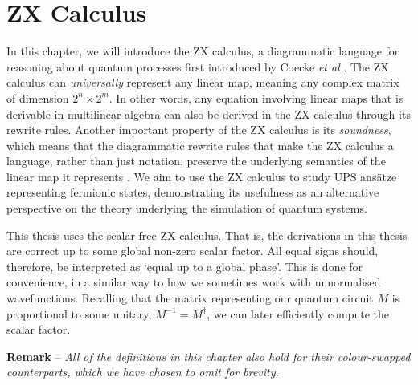 \chapter{ZX Calculus}%
\label{zx-calculus}

In this chapter, we will introduce the ZX calculus, a diagrammatic language for reasoning about quantum processes first introduced by Coecke \textit{et al} \cite{Coecke2011}. The ZX calculus can \textit{universally} represent any linear map, meaning any complex matrix of dimension $2^n \times 2^m$. In other words, any equation involving linear maps that is derivable in multilinear algebra can also be derived in the ZX calculus through its rewrite rules. Another important property of the ZX calculus is its \textit{soundness}, which means that the diagrammatic rewrite rules that make the ZX calculus a language, rather than just notation, preserve the underlying semantics of the linear map it represents \cite{Wetering2020}. We aim to use the ZX calculus to study UPS ansätze representing fermionic states, demonstrating its usefulness as an alternative perspective on the theory underlying the simulation of quantum systems.

This thesis uses the scalar-free ZX calculus. That is, the derivations in this thesis are correct up to some global non-zero scalar factor. All equal signs should, therefore, be interpreted as `equal up to a global phase'. This is done for convenience, in a similar way to how we sometimes work with unnormalised wavefunctions. Recalling that the matrix representing our quantum circuit $M$ is proportional to some unitary, $M^{-1} = M^\dagger$, we can later efficiently compute the scalar factor.

\hangindent=10pt 
\textbf{Remark} -- \textit{All of the definitions in this chapter also hold for their colour-swapped counterparts, which we have chosen to omit for brevity.}

